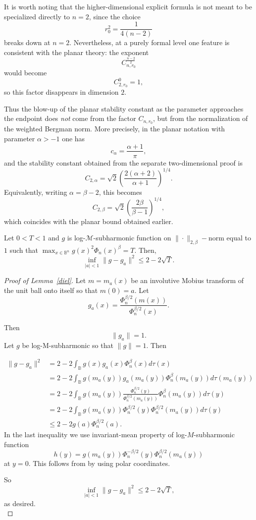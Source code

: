 \documentclass[a4paper,10pt]{amsart}
\begin{document}
\begin{numrem}
It is worth noting that the higher-dimensional explicit formula is not meant to be specialized directly to $n=2$, since the choice
\[
r_0^2=\frac{1}{4(n-2)}
\]
breaks down at $n=2$. Nevertheless, at a purely formal level one feature is consistent with the planar theory: the exponent
\[
C_{n,r_0}^{\frac{n-2}{2}}
\]
would become
\[
C_{2,r_0}^{0}=1,
\]
so this factor disappears in dimension $2$.

Thus the blow-up of the planar stability constant as the parameter approaches the endpoint does \emph{not} come from the factor $C_{n,r_0}$, but from the normalization of the weighted Bergman norm. More precisely, in the planar notation with parameter $\alpha>-1$ one has
\[
c_\alpha=\frac{\alpha+1}{\pi},
\]
and the stability constant obtained from the separate two-dimensional proof is
\[
C_{2,\alpha}
=
\sqrt2\left(\frac{2(\alpha+2)}{\alpha+1}\right)^{1/4}.
\]
Equivalently, writing $\alpha=\beta-2$, this becomes
\[
C_{2,\beta}
=
\sqrt2\left(\frac{2\beta}{\beta-1}\right)^{1/4},
\]
which coincides with the planar bound obtained earlier.
\end{numrem}
\begin{numlemma}\label{diel}
Let $0<T<1$ and $g$ is log-$\mathcal{M}$-subharmonic function on $\|\cdot\|_{2,\beta}-$norm equal to $1$ such that
$\max_{x \in \mathbb{B}^n}g(x)^2\Phi_n(x)^{{\beta}}=T$. Then,
 $$\inf_{|a|<1}\|g-g_a\|^2\le 2-2 \sqrt{T}.$$
\end{numlemma}
\begin{proof}[Proof of Lemma~\ref{diel}]
Let $m=m_a(x)$ be an involutive Mobius transform of the unit ball onto itself so that $m(0)=a$. Let $$g_a(x)=\frac{\Phi^{\beta/2}_n(m(x))}{{\Phi^{\beta/2}_n(x)}}. $$

Then $$\|g_a\|=1.$$ Let $g$ be log-M-subharmonic so that $\|g\|=1$. Then

\[\begin{split}\|g-g_a\|^2 &= 2 -2\int_{\mathbb{B}} g(x) g_a(x) \Phi_n^\beta(x) d\tau(x)
\\&=2 -2\int_{\mathbb{B}} g(m_a(y)) g_a(m_a(y)) \Phi_n^\beta(m_a(y)) d\tau(m_a(y))
\\&=2 -2\int_{\mathbb{B}} g(m_a(y)) \frac{\Phi^{\beta/2}_n(y)}{{\Phi^{\beta/2}_n(m_a(y))}} \Phi_n^\beta(m_a(y)) d\tau(y)
\\&=2 -2\int_{\mathbb{B}} g(m_a(y)) {\Phi^{\beta/2}_n(y)}\Phi_n^{\beta/2}(m_a(y)) d\tau(y)
\\&\le 2-2 g(a) \Phi_n^{\beta/2}(a).\end{split}\]
In the last inequality we use invariant-mean property of log-$M$-subharmonic function $$h(y)=g(m_a(y)) {\Phi^{-\beta/2}_n(y)}\Phi_n^{\beta/2}(m_a(y))$$ at $y=0$. This follows from \cite[Corollary~4.13]{stoll} by using polar coordinates.

So $$\inf_{|a|<1}\|g-g_a\|^2\le 2-2 \sqrt{T},$$ as desired.\\
\end{proof}
\end{document}

